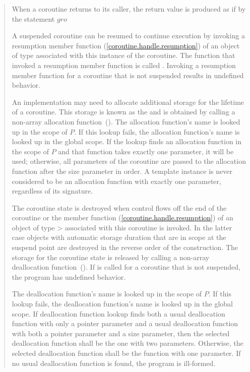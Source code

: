 \begin{quote}
\pnum
When a coroutine returns to its caller, the return value is produced as if by the statement \mbox{$gro$\tcode{;}}


\pnum
A suspended coroutine can be resumed
to continue execution by invoking
a resumption member function (\ref{coroutine.handle.resumption}) of an object of type  
associated with this instance of the coroutine. The function that invoked a resumption member function is called . Invoking a resumption member function for a coroutine that is not suspended results in undefined behavior. 

\pnum
An implementation may need to allocate additional storage for the 
lifetime of a coroutine. This storage is known as the  and is obtained by calling a non-array allocation function~().
The allocation function's name is looked up in the scope of $P$. If this lookup fails, the allocation function's name is looked up in the global scope. If the lookup finds an allocation function in the scope of $P$ and that function takes exactly one parameter, it will be used; otherwise, all parameters of the coroutine are passed to the allocation function after the size parameter in order.
A template instance is never considered to be an allocation function with exactly one parameter, regardless of its signature. 

\pnum
The coroutine state is destroyed when
control flows off the end of the coroutine or
the  member function (\ref{coroutine.handle.resumption}) of an object of type > associated with this coroutine is invoked. In the latter case objects with automatic storage duration that are in scope
at the suspend point are destroyed in the reverse order of the construction. The storage for the coroutine state is released by calling a non-array deallocation
function~(). If  is called for a coroutine that is not suspended, the program has undefined behavior.

\pnum
The deallocation function's name is looked up in the scope of $P$. If this lookup fails, the deallocation function's name is looked up in the global scope. If deallocation function lookup finds both a usual deallocation function with only a pointer parameter and a usual deallocation function with both a pointer parameter and a size parameter, then the selected deallocation function shall be the one with two parameters. Otherwise, the selected deallocation function shall be the function with one parameter. If no usual deallocation function is found, the program is ill-formed.


\end{quote}
